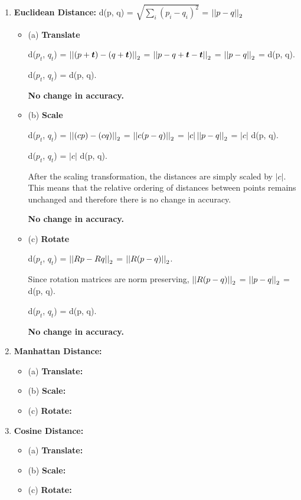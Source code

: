 \documentclass[fleqn]{article}
\begin{document}
\begin{enumerate}
	\item \textbf{Euclidean Distance:} d(p, q) = $\sqrt{\sum_i (p_i - q_i)^2}$ = $\left\vert\left\vert p - q \right\vert\right\vert_2$
	      \begin{itemize}
		      \item (a) \textbf{Translate}

		            d($p_t$, $q_t$) = $\left\vert\left\vert (p + \boldsymbol{t}) - (q + \boldsymbol{t}) \right\vert\right\vert_2$ = $\left\vert\left\vert p - q + \boldsymbol{t}  - \boldsymbol{t} \right\vert\right\vert_2$ = $\left\vert\left\vert p - q \right\vert\right\vert_2$ = d(p, q).

		            d($p_t$, $q_t$) = d(p, q).

		            \textbf{No change in accuracy.}

		      \item (b) \textbf{Scale}

		            d($p_t$, $q_t$) = $\left\vert\left\vert (c p) - (c q) \right\vert\right\vert_2$ = $\left\vert\left\vert c (p - q) \right\vert\right\vert_2$ = $|c| \left\vert\left\vert p - q \right\vert\right\vert_2$ = $|c|$ d(p, q).

		            d($p_t$, $q_t$) = $|c|$ d(p, q).

		            After the scaling transformation, the distances are simply scaled by $|c|$.
		            This means that the relative ordering of distances between points remains unchanged and therefore there is no change in accuracy.

		            \textbf{No change in accuracy.}

		      \item (c) \textbf{Rotate}

		            d($p_t$, $q_t$) = $\left\vert\left\vert R p - R q \right\vert\right\vert_2$ = $\left\vert\left\vert R (p - q) \right\vert\right\vert_2$.

		            Since rotation matrices are norm preserving, $\left\vert\left\vert R (p - q) \right\vert\right\vert_2$ = $\left\vert\left\vert p - q \right\vert\right\vert_2$ = d(p, q).

		            d($p_t$, $q_t$) = d(p, q).

		            \textbf{No change in accuracy.}
	      \end{itemize}

	\item \textbf{Manhattan Distance:}
	      \begin{itemize}
		      \item (a) \textbf{Translate:}
		      \item (b) \textbf{Scale:}
		      \item (c) \textbf{Rotate:}
	      \end{itemize}

	\item \textbf{Cosine Distance:}
	      \begin{itemize}
		      \item (a) \textbf{Translate:}
		      \item (b) \textbf{Scale:}
		      \item (c) \textbf{Rotate:}
	      \end{itemize}
\end{enumerate}
\end{document}
